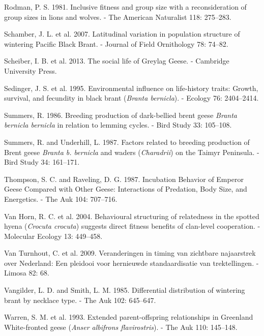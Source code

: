 \documentclass[10pt,twocolumn]{paper}
\begin{document}
\hypertarget{ref-rodman1981lions}{}
Rodman, P. S. 1981. Inclusive fitness and group size with a
reconsideration of group sizes in lions and wolves. - The American
Naturalist 118: 275--283.

\hypertarget{ref-JOFO:JOFO087}{}
Schamber, J. L. et al. 2007. Latitudinal variation in population
structure of wintering Pacific Black Brant. - Journal of Field
Ornithology 78: 74--82.

\hypertarget{ref-scheiber2013social}{}
Scheiber, I. B. et al. 2013. The social life of Greylag Geese. -
Cambridge University Press.

\hypertarget{ref-ECY:ECY19957682404}{}
Sedinger, J. S. et al. 1995. Environmental influence on life-history
traits: Growth, survival, and fecundity in black brant (\emph{Branta
bernicla}). - Ecology 76: 2404--2414.

\hypertarget{ref-summers1986breeding}{}
Summers, R. 1986. Breeding production of dark-bellied brent geese
\emph{Branta bernicla bernicla} in relation to lemming cycles. - Bird
Study 33: 105--108.

\hypertarget{ref-summers1987factors}{}
Summers, R. and Underhill, L. 1987. Factors related to breeding
production of Brent geese \emph{Branta b. bernicla} and waders
(\emph{Charadrii}) on the Taimyr Peninsula. - Bird Study 34: 161--171.

\hypertarget{ref-thompson1987emperor}{}
Thompson, S. C. and Raveling, D. G. 1987. Incubation Behavior of Emperor
Geese Compared with Other Geese: Interactions of Predation, Body Size,
and Energetics. - The Auk 104: 707--716.

\hypertarget{ref-MEC:MEC2071}{}
Van Horn, R. C. et al. 2004. Behavioural structuring of relatedness in
the spotted hyena (\emph{Crocuta crocuta}) suggests direct fitness
benefits of clan-level cooperation. - Molecular Ecology 13: 449--458.

\hypertarget{ref-van2009veranderingen}{}
Van Turnhout, C. et al. 2009. Veranderingen in timing van zichtbare
najaarstrek over Nederland: Een pleidooi voor hernieuwde standaardisatie
van trektellingen. - Limosa 82: 68.

\hypertarget{ref-vangilder1985differential}{}
Vangilder, L. D. and Smith, L. M. 1985. Differential distribution of
wintering brant by necklace type. - The Auk 102: 645--647.

\hypertarget{ref-10.2307ux2f4088245}{}
Warren, S. M. et al. 1993. Extended parent-offspring relationships in
Greenland White-fronted geese (\emph{Anser albifrons flavirostris}). -
The Auk 110: 145--148.
\end{document}
